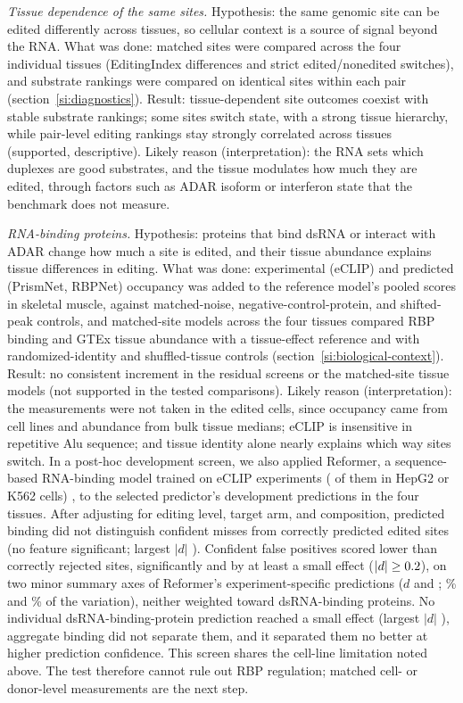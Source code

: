 \documentclass[9pt,twoside]{pnas-new}
\begin{document}
\textit{Tissue dependence of the same sites.} Hypothesis: the same genomic site can be edited differently across tissues, so cellular context is a source of signal beyond the RNA. What was done: matched sites were compared across the four individual tissues (EditingIndex differences and strict edited/nonedited switches), and substrate rankings were compared on identical sites within each pair (section~\ref{si:diagnostics}). Result: tissue-dependent site outcomes coexist with stable substrate rankings; some sites switch state, with a strong tissue hierarchy, while pair-level editing rankings stay strongly correlated across tissues (supported, descriptive). Likely reason (interpretation): the RNA sets which duplexes are good substrates, and the tissue modulates how much they are edited, through factors such as ADAR isoform or interferon state that the benchmark does not measure.

\textit{RNA-binding proteins.} Hypothesis: proteins that bind dsRNA or interact with ADAR change how much a site is edited, and their tissue abundance explains tissue differences in editing. What was done: experimental (eCLIP) and predicted (PrismNet, RBPNet) occupancy was added to the reference model's pooled scores in skeletal muscle, against matched-noise, negative-control-protein, and shifted-peak controls, and matched-site models across the four tissues compared RBP binding and GTEx tissue abundance with a tissue-effect reference and with randomized-identity and shuffled-tissue controls (section~\ref{si:biological-context}). Result: no consistent increment in the residual screens or the matched-site tissue models (not supported in the tested comparisons). Likely reason (interpretation): the measurements were not taken in the edited cells, since occupancy came from cell lines and abundance from bulk tissue medians; eCLIP is insensitive in repetitive Alu sequence; and tissue identity alone nearly explains which way sites switch. In a post-hoc development screen, we also applied Reformer, a sequence-based RNA-binding model trained on \ReformerModels{} eCLIP experiments (\ReformerModelsCellLines{} of them in HepG2 or K562 cells) \cite{Shen2025Reformer}, to the selected predictor's development predictions in the four tissues. After adjusting for editing level, target arm, and composition, predicted binding did not distinguish confident misses from correctly predicted edited sites (no feature significant; largest $|d|$ \ReformerMissLargestD{}). Confident false positives scored lower than correctly rejected sites, significantly and by at least a small effect ($|d|\geq0.2{}$), on two minor summary axes of Reformer's \ReformerModels{} experiment-specific predictions ($d$ \ReformerFalsePosTwoD{} and \ReformerFalsePosThreeD{}; \ReformerTwoVariance{}\% and \ReformerThreeVariance{}\% of the variation), neither weighted toward dsRNA-binding proteins. No individual dsRNA-binding-protein prediction reached a small effect (largest $|d|$ \ReformerFalsePosLargestBinderD{}), aggregate binding did not separate them, and it separated them no better at higher prediction confidence. This screen shares the cell-line limitation noted above. The test therefore cannot rule out RBP regulation; matched cell- or donor-level measurements are the next step.
\end{document}
